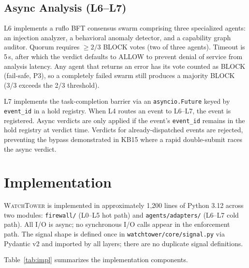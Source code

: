 \documentclass[conference]{IEEEtran}
\begin{document}
\subsection{Async Analysis (L6--L7)}

L6 implements a ruflo BFT consensus swarm comprising three specialized
agents: an injection analyzer, a behavioral anomaly detector, and a
capability graph auditor. Quorum requires $\geq 2/3$ BLOCK votes (two
of three agents). Timeout is 5\,s, after which the verdict defaults to
ALLOW to prevent denial of service from analysis latency. Any agent that
returns an error has its vote counted as BLOCK (fail-safe, P3), so a
completely failed swarm still produces a majority BLOCK (3/3 exceeds the
2/3 threshold).

L7 implements the task-completion barrier via an \texttt{asyncio.Future}
keyed by \texttt{event\_id} in a hold registry. When L4 routes an event
to L6--L7, the event is registered. Async verdicts are only applied if
the event's \texttt{event\_id} remains in the hold registry at verdict
time. Verdicts for already-dispatched events are rejected, preventing
the bypass demonstrated in KB15 where a rapid double-submit races the
async verdict.

\section{Implementation}
\label{sec:impl}

\textsc{WatchTower} is implemented in approximately 1{,}200 lines of
Python 3.12 across two modules: \texttt{firewall/} (L0--L5 hot path) and
\texttt{agents/adapters/} (L6--L7 cold path). All I/O is async; no
synchronous I/O calls appear in the enforcement path. The signal shape is
defined once in \texttt{watchtower/core/signal.py} via Pydantic v2 and
imported by all layers; there are no duplicate signal definitions.

Table~\ref{tab:impl} summarizes the implementation components.
\end{document}
